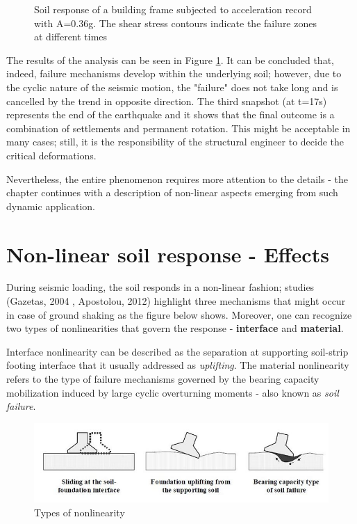 \documentclass[11pt,a4paper]{report}
\begin{document}
\begin{figure}[!h]
\begin{minipage}[b]{0.45\textwidth}
   		\caption{Soil response of a building frame subjected to acceleration record with A=0.36g. The shear stress contours indicate the failure zones at different times}
   		\label{new4}
   	\end{minipage}
   \end{figure} 
  
 The results of the analysis can be seen in Figure \ref{new4}. It can be concluded that, indeed, failure mechanisms develop within the underlying soil; however, due to the cyclic nature of the seismic motion, the "failure" does not take long and is cancelled by the trend in opposite direction. The third snapshot (at t=17s) represents the end of the earthquake and it shows that the final outcome is a combination of settlements and permanent rotation. This might be acceptable in many cases; still, it is the responsibility of the structural engineer to decide the critical deformations.
 
 
 Nevertheless, the entire phenomenon requires more attention to the details - the chapter continues with a description of non-linear aspects emerging from such dynamic application.
  
  \newpage
\section{Non-linear soil response - Effects}
During seismic loading, the soil responds in a non-linear fashion; studies (Gazetas, 2004 \cite{gazetas2004nonlinear}, Apostolou, 2012\cite{apostolou2011soil}) highlight three mechanisms that might occur in case of ground shaking as the figure below shows. Moreover, one can recognize two types of nonlinearities that govern the response - \textbf{interface} and \textbf{material}.

Interface nonlinearity can be described as the separation at supporting soil-strip footing interface that it usually addressed as \textit{uplifting}. The material nonlinearity refers to the type of failure mechanisms governed by the bearing capacity mobilization induced by large cyclic overturning moments - also known as \textit{soil failure}. 

\begin{figure}[h!]
	\centering
	\includegraphics[width=0.7\linewidth]{"nonlin"}
	\caption{Types of nonlinearity}
	\label{types}
\end{figure}
\end{document}
